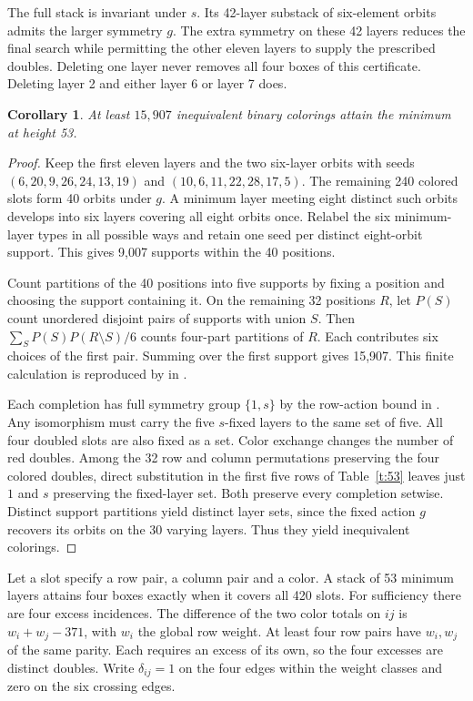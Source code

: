 \documentclass[11pt]{article}
\newtheorem{corollary}[theorem]{Corollary}
\begin{document}
The full stack is invariant under $s$. Its 42-layer substack of six-element orbits admits the larger symmetry $g$. The extra symmetry on these 42 layers reduces the final search while permitting the other eleven layers to supply the prescribed doubles. Deleting one layer never removes all four boxes of this certificate. Deleting layer 2 and either layer 6 or layer 7 does.

\begin{corollary}
At least $15{,}907$ inequivalent binary colorings attain the minimum at height 53.
\end{corollary}
\begin{proof}
Keep the first eleven layers and the two six-layer orbits with seeds $(6,20,9,26,24,13,19)$ and $(10,6,11,22,28,17,5)$. The remaining 240 colored slots form 40 orbits under $g$. A minimum layer meeting eight distinct such orbits develops into six layers covering all eight orbits once. Relabel the six minimum-layer types in all possible ways and retain one seed per distinct eight-orbit support. This gives 9,007 supports within the 40 positions.

Count partitions of the 40 positions into five supports by fixing a position and choosing the support containing it. On the remaining 32 positions $R$, let $P(S)$ count unordered disjoint pairs of supports with union $S$. Then $\sum_S P(S)P(R\setminus S)/6$ counts four-part partitions of $R$. Each contributes six choices of the first pair. Summing over the first support gives 15,907. This finite calculation is reproduced by  in \cite{data}.

Each completion has full symmetry group $\{1,s\}$ by the row-action bound in \cite{data}. Any isomorphism must carry the five $s$-fixed layers to the same set of five. All four doubled slots are also fixed as a set. Color exchange changes the number of red doubles. Among the 32 row and column permutations preserving the four colored doubles, direct substitution in the first five rows of Table~\ref{t:53} leaves just $1$ and $s$ preserving the fixed-layer set. Both preserve every completion setwise. Distinct support partitions yield distinct layer sets, since the fixed action $g$ recovers its orbits on the 30 varying layers. Thus they yield inequivalent colorings.
\end{proof}

Let a slot specify a row pair, a column pair and a color. A stack of 53 minimum layers attains four boxes exactly when it covers all 420 slots. For sufficiency there are four excess incidences. The difference of the two color totals on $ij$ is $w_i+w_j-371$, with $w_i$ the global row weight. At least four row pairs have $w_i,w_j$ of the same parity. Each requires an excess of its own, so the four excesses are distinct doubles. Write $\delta_{ij}=1$ on the four edges within the weight classes and zero on the six crossing edges.
\end{document}
